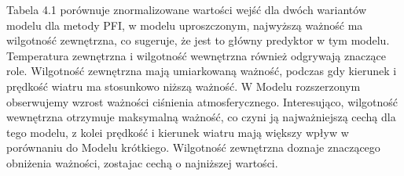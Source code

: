 \documentclass[a4paper,twoside,12pt]{book}
\begin{document}
\begin{table}[!h]
	\centering
	\caption{Porównianie ważności wejść dla metody PFI}
\end{table}
Tabela 4.1 porównuje znormalizowane wartości wejść dla dwóch wariantów modelu dla metody PFI, w modelu uproszczonym, najwyższą ważność ma wilgotność zewnętrzna, co sugeruje, że jest to główny predyktor w tym modelu. Temperatura zewnętrzna i wilgotność wewnętrzna również odgrywają znaczące role. Wilgotność zewnętrzna mają umiarkowaną ważność, podczas gdy kierunek i prędkość wiatru ma stosunkowo niższą ważność. W Modelu rozszerzonym obserwujemy wzrost ważności ciśnienia atmosferycznego. Interesująco, wilgotność wewnętrzna otrzymuje maksymalną ważność, co czyni ją najważniejszą cechą dla tego modelu, z kolei prędkość i kierunek wiatru mają większy wpływ w porównaniu do Modelu krótkiego. Wilgotność zewnętrzna doznaje znaczącego obniżenia ważności, zostajac cechą o najniższej wartości.
\newpage
\end{document}
